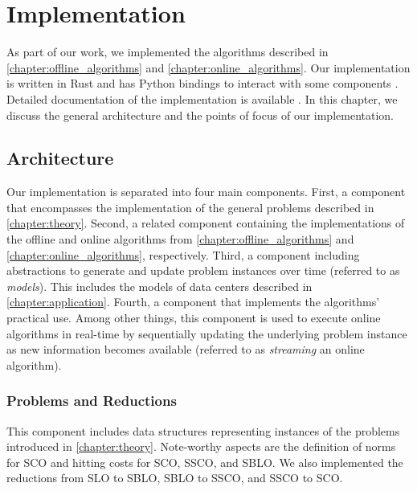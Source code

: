
\chapter{Implementation}\label{chapter:implementation}

As part of our work, we implemented the algorithms described in \autoref{chapter:offline_algorithms} and \autoref{chapter:online_algorithms}. Our implementation is written in Rust and has Python bindings to interact with some components \cite{Hübotter2021_2, Hübotter2021_3}. Detailed documentation of the implementation is available \cite{Hübotter2021_4}. In this chapter, we discuss the general architecture and the points of focus of our implementation.

\section{Architecture}\label{section:implementation:architecture}

Our implementation is separated into four main components. First, a component that encompasses the implementation of the general problems described in \autoref{chapter:theory}. Second, a related component containing the implementations of the offline and online algorithms from \autoref{chapter:offline_algorithms} and \autoref{chapter:online_algorithms}, respectively. Third, a component including abstractions to generate and update problem instances over time (referred to as \emph{models}). This includes the models of data centers described in \autoref{chapter:application}. Fourth, a component that implements the algorithms' practical use. Among other things, this component is used to execute online algorithms in real-time by sequentially updating the underlying problem instance as new information becomes available (referred to as \emph{streaming} an online algorithm).

\subsection{Problems and Reductions}

This component includes data structures representing instances of the problems introduced in \autoref{chapter:theory}. Note-worthy aspects are the definition of norms for SCO and hitting costs for SCO, SSCO, and SBLO. We also implemented the reductions from SLO to SBLO, SBLO to SSCO, and SSCO to SCO.

